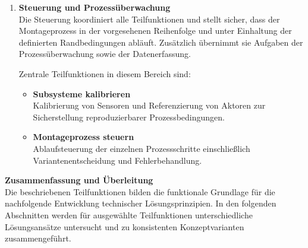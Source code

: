 \begin{enumerate}
\begin{itemize}
        \item \textbf{Schraubwerkzeug positionieren}\\
        Exaktes Anfahren der Schraubpositionen innerhalb der vorgegebenen Toleranzen.

        \item \textbf{Drehmoment einstellen und überwachen}\\
        Sicherstellung eines definierten Drehmoments während des Einschraubvorgangs.

        \item \textbf{Schraubtiefe erfassen}\\
        Kontrolle der Einschraubtiefe als zusätzliches Qualitätsmerkmal.

        \item \textbf{Schlitten schieben}\\
        Inkrementelle Bewegung des Schlittens entlang der Führung, um den Schraubprozess schrittweise über die gesamte Führungslänge durchführen zu können.
    \end{itemize}

    \item \textbf{Steuerung und Prozessüberwachung}\\
    Die Steuerung koordiniert alle Teilfunktionen und stellt sicher, dass der Montageprozess in der vorgesehenen Reihenfolge und unter Einhaltung der definierten Randbedingungen abläuft. Zusätzlich übernimmt sie Aufgaben der Prozessüberwachung sowie der Datenerfassung.

    Zentrale Teilfunktionen in diesem Bereich sind:
    \begin{itemize}
        \item \textbf{Subsysteme kalibrieren}\\
        Kalibrierung von Sensoren und Referenzierung von Aktoren zur Sicherstellung reproduzierbarer Prozessbedingungen.

        \item \textbf{Montageprozess steuern}\\
        Ablaufsteuerung der einzelnen Prozessschritte einschließlich Variantenentscheidung und Fehlerbehandlung.
    \end{itemize}
\end{enumerate}

\textbf{Zusammenfassung und Überleitung}\\
Die beschriebenen Teilfunktionen bilden die funktionale Grundlage für die nachfolgende Entwicklung technischer Lösungsprinzipien. In den folgenden Abschnitten werden für ausgewählte Teilfunktionen unterschiedliche Lösungsansätze untersucht und zu konsistenten Konzeptvarianten zusammengeführt.

